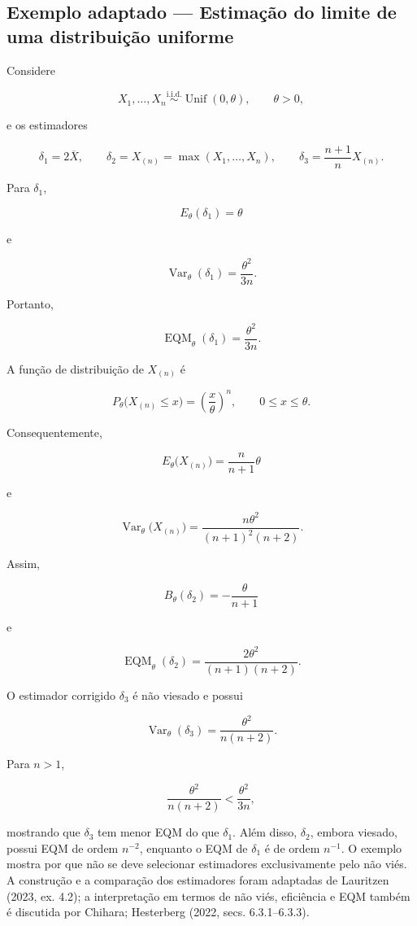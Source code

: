 \documentclass[
  letterpaper,
  DIV=11,
  numbers=noendperiod]{scrreprt}
\begin{document}
\subsection*{Exemplo adaptado --- Estimação do limite de uma
distribuição
uniforme}\label{exemplo-adaptado-estimauxe7uxe3o-do-limite-de-uma-distribuiuxe7uxe3o-uniforme}

Considere

\[X_1,\ldots,X_n
\overset{\mathrm{i.i.d.}}{\sim}
\operatorname{Unif}(0,\theta),
\qquad \theta>0,\]

e os estimadores

\[\delta_1=2\overline{X},
\qquad
\delta_2=X_{(n)}=\max(X_1,\ldots,X_n),
\qquad
\delta_3=\frac{n+1}{n}X_{(n)}.\]

Para \(\delta_1\),

\[E_\theta(\delta_1)=\theta\]

e

\[\operatorname{Var}_\theta(\delta_1)
=
\frac{\theta^2}{3n}.\]

Portanto,

\[\operatorname{EQM}_\theta(\delta_1)
=
\frac{\theta^2}{3n}.\]

A função de distribuição de \(X_{(n)}\) é

\[P_\theta\bigl(X_{(n)}\leq x\bigr)
=
\left(\frac{x}{\theta}\right)^n,
\qquad 0\leq x\leq\theta.\]

Consequentemente,

\[E_\theta\bigl(X_{(n)}\bigr)
=
\frac{n}{n+1}\theta\]

e

\[\operatorname{Var}_\theta\bigl(X_{(n)}\bigr)
=
\frac{n\theta^2}{(n+1)^2(n+2)}.\]

Assim,

\[B_\theta(\delta_2)
=
-\frac{\theta}{n+1}\]

e

\[\operatorname{EQM}_\theta(\delta_2)
=
\frac{2\theta^2}{(n+1)(n+2)}.\]

O estimador corrigido \(\delta_3\) é não viesado e possui

\[\operatorname{Var}_\theta(\delta_3)
=
\frac{\theta^2}{n(n+2)}.\]

Para \(n>1\),

\[\frac{\theta^2}{n(n+2)}
<
\frac{\theta^2}{3n},\]

mostrando que \(\delta_3\) tem menor EQM do que \(\delta_1\). Além
disso, \(\delta_2\), embora viesado, possui EQM de ordem \(n^{-2}\),
enquanto o EQM de \(\delta_1\) é de ordem \(n^{-1}\). O exemplo mostra
por que não se deve selecionar estimadores exclusivamente pelo não viés.
A construção e a comparação dos estimadores foram adaptadas de Lauritzen
(2023, ex. 4.2); a interpretação em termos de não viés, eficiência e EQM
também é discutida por Chihara; Hesterberg (2022, secs. 6.3.1--6.3.3).
\end{document}
